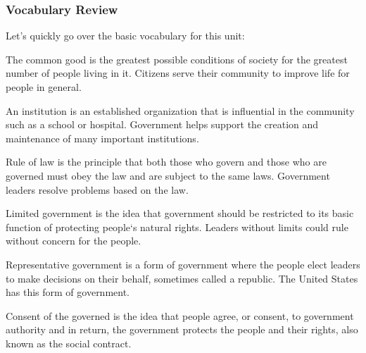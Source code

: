 
\subsubsection*{Vocabulary Review}

Let's quickly go over the basic vocabulary for this unit:

\begin{definition}
    The common good is the greatest possible conditions of society for the
    greatest number of people living in it. Citizens serve their community to
    improve life for people in general.
\end{definition}

\begin{definition}[Institution]
    An institution is an established organization that is influential in the
    community such as a school or hospital. Government helps support the
    creation and maintenance of many important institutions.
\end{definition}

\begin{definition}
    Rule of law is the principle that both those who govern and those who are
    governed must obey the law and are subject to the same laws. Government
    leaders resolve problems based on the law.
\end{definition}

\begin{definition}
    Limited government is the idea that government should be restricted to its
    basic function of protecting people`s natural rights. Leaders without
    limits could rule without concern for the people.
\end{definition}

\begin{definition}
    Representative government is a form of government where the people elect
    leaders to make decisions on their behalf, sometimes called a republic. The
    United States has this form of government.
\end{definition}

\begin{definition}
    Consent of the governed is the idea that people agree, or consent, to
    government authority and in return, the government protects the people and
    their rights, also known as the social contract.
\end{definition}

